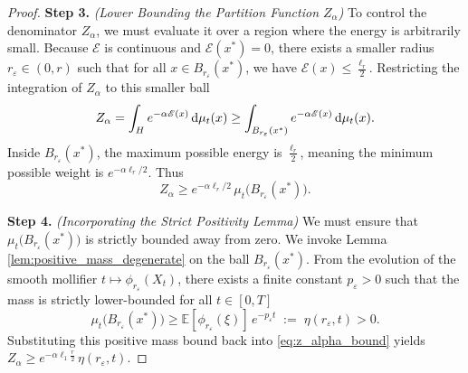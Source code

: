 \documentclass[12pt]{amsart}
\newcommand{\D}[1]{\mbox{\rm #1}}
\newcommand{\dd}{\D{d}}
\numberwithin{equation}{section}
\begin{document}
\begin{proof}
\textbf{Step 3.} \textit{(Lower Bounding the Partition Function $Z_\alpha$)} 
To control the denominator $Z_\alpha$, we must evaluate it over a region where the energy is arbitrarily small. Because $\mathscr{E}$ is continuous and $\mathscr{E}(x^*) = 0$, there exists a smaller radius $r_\varepsilon \in (0, r)$ such that for all $x \in B_{r_\varepsilon}(x^*)$, we have $\mathscr{E}(x) \leq \frac{\ell_r}{2}$.
Restricting the integration of $Z_\alpha$ to this smaller ball 
\begin{equation*}
    Z_\alpha = \int_H e^{-\alpha \mathscr{E}(x)} \,\dd\mu_t(x) \geq \int_{B_{r_\varepsilon}(x^*)} e^{-\alpha \mathscr{E}(x)} \,\dd\mu_t(x).
\end{equation*}
Inside $B_{r_\varepsilon}(x^*)$, the maximum possible energy is $\frac{\ell_r}{2}$, meaning the minimum possible weight is $e^{-\alpha \ell_r / 2}$. Thus
\begin{equation} \label{eq:z_alpha_bound}
    Z_\alpha \geq e^{-\alpha \ell_r/ 2} \,\mu_t\big(B_{r_\varepsilon}(x^*)\big).
\end{equation}

\textbf{Step 4.} \textit{(Incorporating the Strict Positivity Lemma)} 
We must ensure that $\mu_t\big(B_{r_\varepsilon}(x^*)\big)$ is strictly bounded away from zero. We invoke Lemma \ref{lem:positive_mass_degenerate} on the ball $B_{r_\varepsilon}(x^*)$. From the evolution of the smooth mollifier $t\mapsto\phi_{r_\varepsilon}(X_t)$, there exists a finite constant $p_\varepsilon > 0$ such that the mass is strictly lower-bounded for all $t \in [0,T]$
\begin{equation*}
    \mu_t\big(B_{r_\varepsilon}(x^*)\big) \geq \mathbb{E}[\phi_{r_\varepsilon}(\xi)]\, e^{-p_\varepsilon t} \;:=\; \eta(r_\varepsilon, t) > 0.
\end{equation*}
Substituting this positive mass bound back into \eqref{eq:z_alpha_bound} yields $Z_\alpha \geq e^{-\alpha \ell_1 \frac{r}{2}}\, \eta(r_\varepsilon, t)$.


\end{proof}
\end{document}
